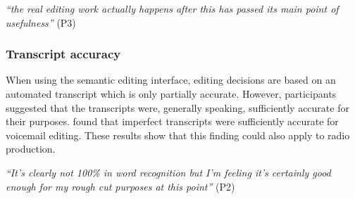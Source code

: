 \textit{``the real editing work actually happens after this has passed its main point of usefulness''} (P3)











\subsubsection{Transcript accuracy}
When using the semantic editing interface, editing decisions are based on an automated transcript which is only
partially accurate. However, participants suggested that the transcripts were, generally speaking, sufficiently
accurate for their purposes.  \citet{Whittaker2004} found that imperfect transcripts were sufficiently accurate for
voicemail editing. These results show that this finding could also apply to radio production.

\textit{``It's clearly not 100\% in word recognition but I'm feeling it's certainly good enough for my rough cut
  purposes at this point''} (P2)

